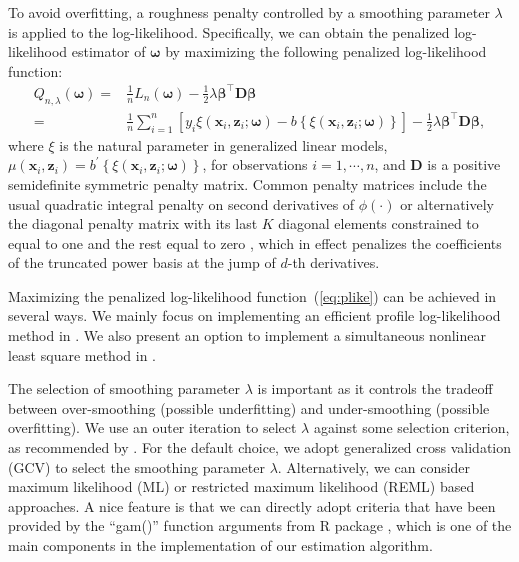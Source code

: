 To avoid overfitting, a roughness penalty controlled by a smoothing parameter $\lambda$ is applied to the log-likelihood. Specifically, we can obtain the penalized log-likelihood estimator of $\boldsymbol{\omega}$ by maximizing the following penalized log-likelihood function:
\begin{equation}\begin{aligned}
  Q_{n, \lambda}(\boldsymbol{\omega})=& \frac{1}{n} L_{n}(\boldsymbol{\omega})-\frac{1}{2} \lambda \boldsymbol{\beta}^{\top} \mathbf{D} \boldsymbol{\beta} \\
  =& \frac{1}{n} \sum_{i=1}^{n}\left[y_{i} \xi\left(\mathbf{x}_{i}, \mathbf{z}_{i} ; \boldsymbol{\omega}\right)-b\left\{\xi\left(\mathbf{x}_{i}, \mathbf{z}_{i} ; \boldsymbol{\omega}\right)\right\}\right] -\frac{1}{2} \lambda \boldsymbol{\beta}^{\top} \mathbf{D} \boldsymbol{\beta},
 \label{eq:plike}
\end{aligned}\end{equation}
where $\xi$ is the natural parameter in generalized linear models, $\mu(\mathbf{x}_{i}, \mathbf{z}_{i})  = b^{\prime}\left\{\xi\left(\mathbf{x}_{i}, \mathbf{z}_{i} ; \boldsymbol{\omega}\right)\right\}$, for observations $i=1,\cdots,n$, and $\mathbf{D}$ is a positive semidefinite symmetric penalty matrix. Common penalty matrices include the usual quadratic integral penalty on second derivatives of $\phi(\cdot)$ or alternatively the diagonal penalty matrix with its last $K$ diagonal elements constrained to equal to one and the rest equal to zero \citep[see e.g.][]{ruppert_theory_2000,yu_penalized_2002}, which in effect penalizes the coefficients of the truncated power basis at the jump of $d$-th derivatives. 

Maximizing the penalized log-likelihood function~(\ref{eq:plike}) can be achieved in several ways. We mainly focus on implementing an efficient profile log-likelihood method in \cite{yu_penalised_2017}. We also present an option to implement a simultaneous nonlinear least square method in \cite{yu_penalized_2002}. 

The selection of smoothing parameter $\lambda$ is important as it controls the tradeoff between over-smoothing (possible underfitting) and under-smoothing (possible overfitting). We use an outer iteration to select $\lambda$ against some selection criterion, as recommended by \cite{Wood_fast_2011}. For the default choice, we adopt generalized cross validation (GCV) to select the smoothing parameter $\lambda$. Alternatively, we can consider maximum likelihood (ML) \citep{anderssen_time_1974} or restricted maximum likelihood (REML) \citep{wahba_comparison_1985} based approaches. A nice feature is that we can directly adopt criteria that have been provided by the ``gam()'' function arguments from R package , which is one of the main components in the implementation of our  estimation algorithm. 


